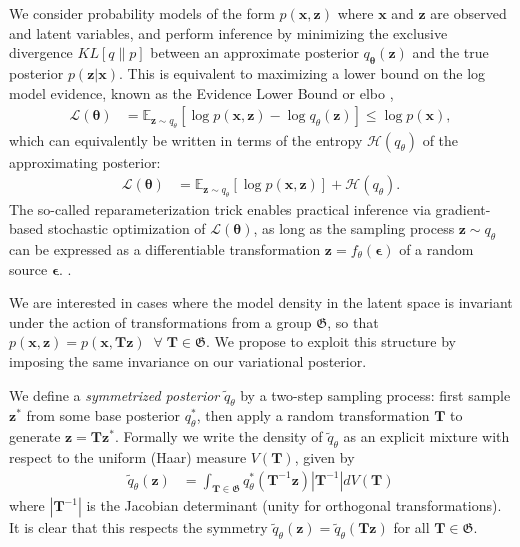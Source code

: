\documentclass{article}
\newcommand{\E}{\mathbb{E}}
\newcommand{\G}{\mathfrak{G}}
\renewcommand{\v}[1]{\mathbf{#1}}
\newcommand{\elbo}{{\sc elbo}}
\begin{document}
We consider probability models of the form $p(\v{x}, \v{z})$ where $\v{x}$ and
$\v{z}$ are observed and latent variables, and perform
inference by minimizing the exclusive divergence $KL[q \| p]$
between an approximate posterior $q_{\v{\theta}}(\v{z})$ and the true
posterior $p(\v{z}|\v{x})$. This is equivalent to maximizing a lower
bound on the log model evidence, known as the Evidence Lower Bound or \elbo \; \citep{bishop2006pattern},
\begin{align}
\mathcal{L}(\v{\theta}) & =\E_{\v{z}\sim
  q_\theta}\left[\log p(\v{x}, \v{z}) - \log q_\theta(\v{z})\right] \le \log p(\v{x}),\label{eqn:elbo_mc}
\end{align}
which can equivalently be written in terms of the entropy
$\mathcal{H}(q_\theta)$ of the approximating posterior:
\begin{align}
\mathcal{L}(\v{\theta}) \label{eqn:elbo} &= \E_{\v{z}\sim
  q_\theta}\left[\log p(\v{x}, \v{z})\right] + \mathcal{H}(q_\theta).
\end{align}
The so-called reparameterization trick enables practical inference via
gradient-based stochastic optimization of $\mathcal{L}(\v{\theta})$, as
long as the sampling process $\v{z}\sim q_\theta$ can be expressed as
a differentiable transformation $\v{z} = f_\theta(\v{\epsilon})$ of a random
source $\v{\epsilon}$. \citep{kingma2013auto, kucukelbir2016automatic}. 

We are interested in cases where the model density in the latent space is invariant under
the action of transformations from a group $\G$, so that 
$p(\v{x}, \v{z}) = p(\v{x}, \v{T}\v{z}) \;\; \forall \; \v{T} \in
\G.$
We propose to exploit this structure by imposing the same invariance
on our variational posterior. 

We define a {\em symmetrized
  posterior} $\tilde{q}_{\theta}$ by a two-step sampling
process: first sample $\v{z}^*$ from some base posterior $q_\theta^*$, then apply a random
transformation $\v{T}$ to generate $\v{z} =
\v{T}\v{z}^*$. Formally we write the density of $\tilde{q}_{\theta}$ as an
explicit mixture with respect to the uniform (Haar) measure $V(\v{T})$,
given by
\begin{align}
\tilde{q}_{\theta}(\v{z}) &= \int_{\v{T}\in \G}
                            q^*_{\theta}(\v{T}^{-1}\v{z})
                            \left|\v{T}^{-1}\right|dV(\v{T})
\end{align}
where $\left|\v{T}^{-1}\right|$ is the Jacobian
determinant (unity for orthogonal transformations). It is clear that this
respects the symmetry $\tilde{q}_\theta(\v{z})
=\tilde{q}_\theta(\v{T}\v{z})$ for all $\v{T}\in\G$. 
\end{document}
